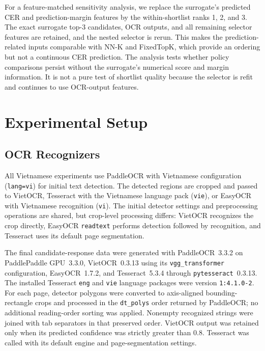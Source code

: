 \documentclass[pdflatex,sn-basic,Numbered,iicol]{sn-jnl}
\begin{document}
For a feature-matched sensitivity analysis, we replace the surrogate's predicted CER and prediction-margin features by the within-shortlist ranks 1, 2, and 3. The exact surrogate top-3 candidates, OCR outputs, and all remaining selector features are retained, and the nested selector is rerun. This makes the prediction-related inputs comparable with NN-K and FixedTopK, which provide an ordering but not a continuous CER prediction. The analysis tests whether policy comparisons persist without the surrogate's numerical score and margin information. It is not a pure test of shortlist quality because the selector is refit and continues to use OCR-output features.

\section{Experimental Setup}
\label{sec:experimental_setup}

\subsection{OCR Recognizers}

All Vietnamese experiments use PaddleOCR with Vietnamese configuration (\texttt{lang=vi}) for initial text detection. The detected regions are cropped and passed to VietOCR, Tesseract with the Vietnamese language pack (\texttt{vie}), or EasyOCR with Vietnamese recognition (\texttt{vi}). The initial detector settings and preprocessing operations are shared, but crop-level processing differs: VietOCR recognizes the crop directly, EasyOCR \texttt{readtext} performs detection followed by recognition, and Tesseract uses its default page segmentation.

The final candidate-response data were generated with PaddleOCR~3.3.2 on PaddlePaddle GPU~3.3.0, VietOCR~0.3.13 using its \texttt{vgg\_transformer} configuration, EasyOCR~1.7.2, and Tesseract~5.3.4 through \texttt{pytesseract}~0.3.13. The installed Tesseract \texttt{eng} and \texttt{vie} language packages were version \texttt{1:4.1.0-2}. For each page, detector polygons were converted to axis-aligned bounding-rectangle crops and processed in the \texttt{dt\_polys} order returned by PaddleOCR; no additional reading-order sorting was applied. Nonempty recognized strings were joined with tab separators in that preserved order. VietOCR output was retained only when its predicted confidence was strictly greater than 0.8. Tesseract was called with its default engine and page-segmentation settings.
\end{document}
